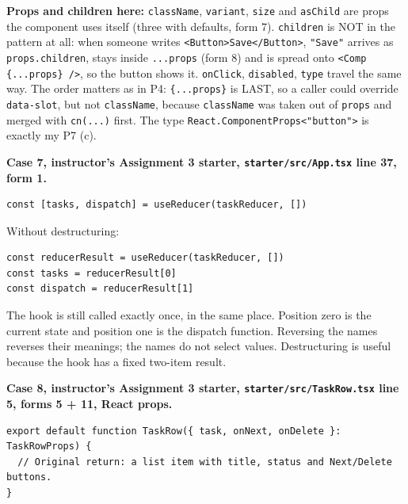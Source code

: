 \textbf{Props and children here:} \passthrough{\lstinline!className!}, \passthrough{\lstinline!variant!}, \passthrough{\lstinline!size!} and \passthrough{\lstinline!asChild!} are props the component uses itself (three with defaults, form 7).
\passthrough{\lstinline!children!} is NOT in the pattern at all: when someone writes \passthrough{\lstinline!<Button>Save</Button>!}, \passthrough{\lstinline!"Save"!} arrives as \passthrough{\lstinline!props.children!}, stays inside
\passthrough{\lstinline!...props!} (form 8) and is spread onto \passthrough{\lstinline!<Comp \{...props\} />!}, so the button shows it. \passthrough{\lstinline!onClick!}, \passthrough{\lstinline!disabled!}, \passthrough{\lstinline!type!} travel the same way.
The order matters as in P4: \passthrough{\lstinline!\{...props\}!} is LAST, so a caller could override \passthrough{\lstinline!data-slot!}, but not \passthrough{\lstinline!className!}, because \passthrough{\lstinline!className!}
was taken out of \passthrough{\lstinline!props!} and merged with \passthrough{\lstinline!cn(...)!} first. The type \passthrough{\lstinline!React.ComponentProps<"button">!} is exactly my P7 (c).

\textbf{Case 7, instructor's Assignment 3 starter, \passthrough{\lstinline!starter/src/App.tsx!} line 37, form 1.}

\begin{lstlisting}
const [tasks, dispatch] = useReducer(taskReducer, [])
\end{lstlisting}

Without destructuring:

\begin{lstlisting}
const reducerResult = useReducer(taskReducer, [])
const tasks = reducerResult[0]
const dispatch = reducerResult[1]
\end{lstlisting}

The hook is still called exactly once, in the same place. Position zero is the current state and
position one is the dispatch function. Reversing the names reverses their meanings; the names
do not select values. Destructuring is useful because the hook has a fixed two-item result.

\textbf{Case 8, instructor's Assignment 3 starter, \passthrough{\lstinline!starter/src/TaskRow.tsx!} line 5, forms 5 + 11, React props.}

\begin{lstlisting}
export default function TaskRow({ task, onNext, onDelete }: TaskRowProps) {
  // Original return: a list item with title, status and Next/Delete buttons.
}
\end{lstlisting}

